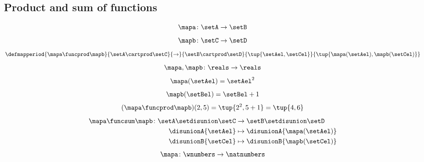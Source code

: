 \begin{forslides}
    \subsection{Product and sum of functions}

    \begin{equation}
        \label{eq:slides_session2_169}
        \mapa\colon \setA\to \setB
    \end{equation}
    \begin{equation}
        \label{eq:slides_session2_170}
        \mapb\colon \setC\to \setD
    \end{equation}
    \begin{equation}
        \label{eq:slides_session2_171}
        \defmapperiod{\mapa \funcprod \mapb}{\setA \cartprod \setC}{\to}{\setB\cartprod \setD}{\tup{\setAel, \setCel}}{\tup{\mapa(\setAel),\mapb(\setCel)}}
    \end{equation}
    \begin{equation}
        \label{eq:slides_session2_172}
        \mapa,\mapb\colon \reals \to \reals
    \end{equation}
    \begin{equation}
        \label{eq:slides_session2_173}
        \mapa(\setAel)=\setAel^2
    \end{equation}
    \begin{equation}
        \label{eq:slides_session2_174}
        \mapb(\setBel)=\setBel+1
    \end{equation}
    \begin{equation}
        \label{eq:slides_session2_175}
        (\mapa \funcprod \mapb)(2,5)=\tup{2^2,5+1}=\tup{4,6}
    \end{equation}
    \begin{equation}
        \label{eq:slides_session2_176}
        \begin{aligned}
            \mapa \funcsum \mapb \colon \setA \setdisunion \setC & \to \setB\setdisunion \setD \\
            \disunionA{\setAel}                                  & \mapsto \disunionA{\mapa(\setAel)} \\
            \disunionB{\setCel}                                  & \mapsto \disunionB{\mapb(\setCel)} \\
        \end{aligned}
    \end{equation}
    \begin{equation}
        \label{eq:slides_session2_177}
        \mapa\colon \wnumbers \to \natnumbers

\end{equation}
\end{forslides}

